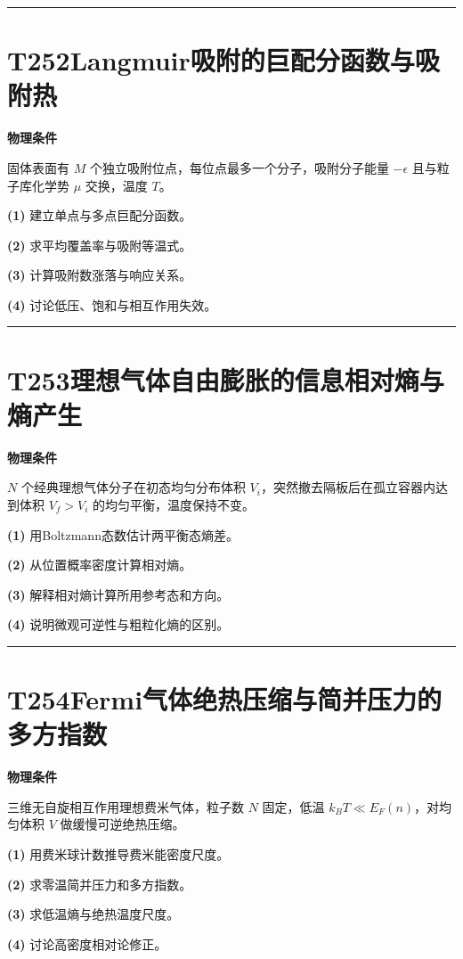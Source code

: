 \documentclass[UTF8,a4paper,11pt,oneside,openany]{ctexbook}
\begin{document}
\par\bigskip\hrule\bigskip
\section*{T252\quad Langmuir吸附的巨配分函数与吸附热}
\textbf{物理条件}\par 固体表面有 \(M\) 个独立吸附位点，每位点最多一个分子，吸附分子能量 \(-\epsilon\) 且与粒子库化学势 \(\mu\) 交换，温度 \(T\)。
\par\noindent\textbf{(1)} 建立单点与多点巨配分函数。
\par\noindent\textbf{(2)} 求平均覆盖率与吸附等温式。
\par\noindent\textbf{(3)} 计算吸附数涨落与响应关系。
\par\noindent\textbf{(4)} 讨论低压、饱和与相互作用失效。

\par\bigskip\hrule\bigskip
\section*{T253\quad 理想气体自由膨胀的信息相对熵与熵产生}
\textbf{物理条件}\par \(N\) 个经典理想气体分子在初态均匀分布体积 \(V_i\)，突然撤去隔板后在孤立容器内达到体积 \(V_f>V_i\) 的均匀平衡，温度保持不变。
\par\noindent\textbf{(1)} 用Boltzmann态数估计两平衡态熵差。
\par\noindent\textbf{(2)} 从位置概率密度计算相对熵。
\par\noindent\textbf{(3)} 解释相对熵计算所用参考态和方向。
\par\noindent\textbf{(4)} 说明微观可逆性与粗粒化熵的区别。

\par\bigskip\hrule\bigskip
\section*{T254\quad Fermi气体绝热压缩与简并压力的多方指数}
\textbf{物理条件}\par 三维无自旋相互作用理想费米气体，粒子数 \(N\) 固定，低温 \(k_BT\ll E_F(n)\)，对均匀体积 \(V\) 做缓慢可逆绝热压缩。
\par\noindent\textbf{(1)} 用费米球计数推导费米能密度尺度。
\par\noindent\textbf{(2)} 求零温简并压力和多方指数。
\par\noindent\textbf{(3)} 求低温熵与绝热温度尺度。
\par\noindent\textbf{(4)} 讨论高密度相对论修正。
\end{document}
